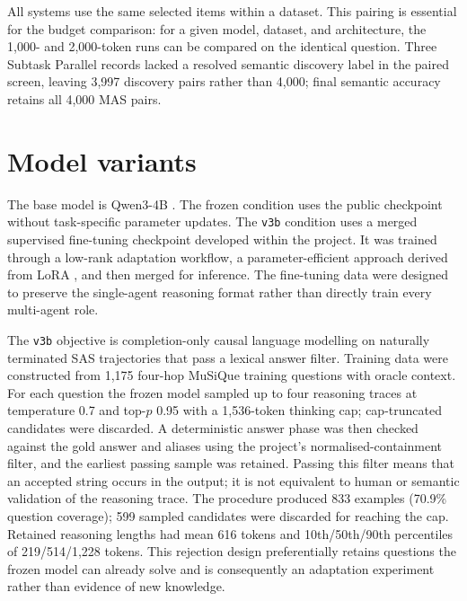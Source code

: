 All systems use the same selected items within a dataset. This pairing is essential for the budget comparison: for a given model, dataset, and architecture, the 1,000- and 2,000-token runs can be compared on the identical question. Three Subtask Parallel records lacked a resolved semantic discovery label in the paired screen, leaving 3,997 discovery pairs rather than 4,000; final semantic accuracy retains all 4,000 MAS pairs.

\section{Model variants}

The base model is Qwen3-4B \citep{yang2025qwen3}. The frozen condition uses the public checkpoint without task-specific parameter updates. The \texttt{v3b} condition uses a merged supervised fine-tuning checkpoint developed within the project. It was trained through a low-rank adaptation workflow, a parameter-efficient approach derived from LoRA \citep{hu2021lora}, and then merged for inference. The fine-tuning data were designed to preserve the single-agent reasoning format rather than directly train every multi-agent role.

The \texttt{v3b} objective is completion-only causal language modelling on naturally terminated SAS trajectories that pass a lexical answer filter. Training data were constructed from 1,175 four-hop MuSiQue training questions with oracle context. For each question the frozen model sampled up to four reasoning traces at temperature 0.7 and top-$p$ 0.95 with a 1,536-token thinking cap; cap-truncated candidates were discarded. A deterministic answer phase was then checked against the gold answer and aliases using the project's normalised-containment filter, and the earliest passing sample was retained. Passing this filter means that an accepted string occurs in the output; it is not equivalent to human or semantic validation of the reasoning trace. The procedure produced 833 examples (70.9\% question coverage); 599 sampled candidates were discarded for reaching the cap. Retained reasoning lengths had mean 616 tokens and 10th/50th/90th percentiles of 219/514/1,228 tokens. This rejection design preferentially retains questions the frozen model can already solve and is consequently an adaptation experiment rather than evidence of new knowledge.

